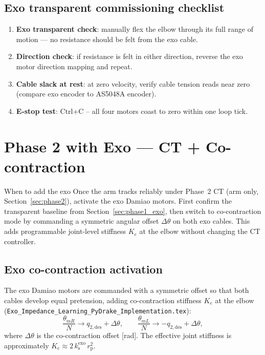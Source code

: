 \documentclass[11pt,a4paper]{article}
\newcommand{\rp}{r_{\mathrm{p}}}
\newcommand{\ks}{k_{\mathrm{s}}}
\begin{document}
\subsection{Exo transparent commissioning checklist}

\begin{enumerate}[leftmargin=2em]
  \item \textbf{Exo transparent check}: manually flex the elbow through its full
        range of motion --- no resistance should be felt from the exo cable.
  \item \textbf{Direction check}: if resistance is felt in either direction,
        reverse the exo motor direction mapping and repeat.
  \item \textbf{Cable slack at rest}: at zero velocity, verify cable tension
        reads near zero (compare exo encoder to AS5048A encoder).
  \item \textbf{E-stop test}: Ctrl+C -- all four motors coast to zero
        within one loop tick.
\end{enumerate}

\section{Phase 2 with Exo --- CT + Co-contraction}
\label{sec:phase2_exo}

\begin{phase2box}{When to add the exo}
Once the arm tracks reliably under Phase~2 CT (arm only,
Section~\ref{sec:phase2}), activate the exo Damiao motors.
First confirm the transparent baseline from Section~\ref{sec:phase1_exo},
then switch to co-contraction mode by commanding a symmetric angular
offset $\Delta\theta$ on both exo cables.  This adds programmable
joint-level stiffness $K_e$ at the elbow without changing the CT controller.
\end{phase2box}

\subsection{Exo co-contraction activation}

The exo Damiao motors are commanded with a symmetric offset so that both
cables develop equal pretension, adding co-contraction stiffness $K_e$ at
the elbow
(\texttt{Exo\_Impedance\_Learning\_PyDrake\_Implementation.tex}):
\begin{equation}
  \frac{\theta_{mR}}{N} \to q_{2,\mathrm{des}} + \Delta\theta, \qquad
  \frac{\theta_{mL}}{N} \to -q_{2,\mathrm{des}} + \Delta\theta,
  \label{eq:exo_cmd}
\end{equation}
where $\Delta\theta$ is the co-contraction offset [rad].  The effective
joint stiffness is approximately $K_e \approx 2\,\ks^{\mathrm{exo}}\,\rp^2$.
\end{document}
